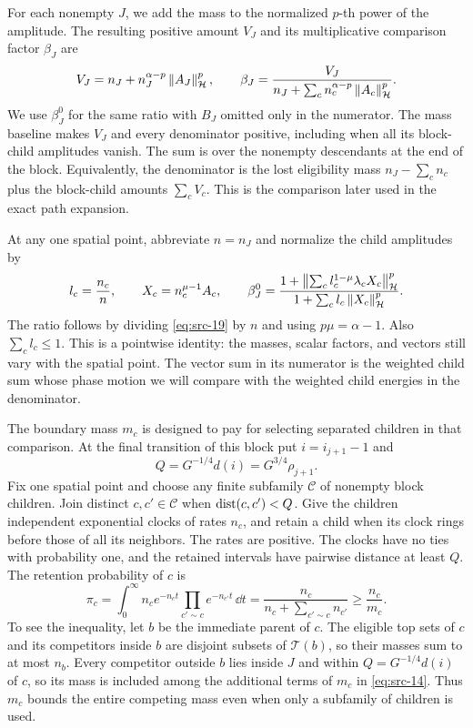 For each nonempty $J$, we add the mass to the normalized $p$-th power
of the amplitude.  The resulting positive amount $V_J$ and its
multiplicative comparison factor $\beta_J$ are
\begin{equation}
 V_J=n_J+n_J^{\alpha-p}\left\|A_J\right\|_{\mathcal H}^p,
 \qquad
 \beta_J=
 \frac{V_J}{n_J+\sum_c n_c^{\alpha-p}\left\|A_c\right\|_{\mathcal H}^p}.
 \label{eq:src-19}
\end{equation}
We use $\beta_J^0$ for the same ratio with $B_J$ omitted only in the
numerator.  The mass baseline makes $V_J$ and every denominator positive,
including when all its block-child amplitudes vanish.  The sum is over
the nonempty descendants at the end of the block.  Equivalently, the
denominator is the lost eligibility mass $n_J-\sum_c n_c$ plus the
block-child amounts $\sum_c V_c$.  This is the comparison later used
in the exact path expansion.

At any one spatial point, abbreviate $n=n_J$ and normalize the child
amplitudes by
\begin{equation}
 l_c=\frac{n_c}{n},\qquad
 X_c=n_c^{\mu-1}A_c,\qquad
 \beta_J^0=
  \frac{1+\left\|\sum_c l_c^{1-\mu}\lambda_c X_c\right\|_{\mathcal H}^p}
       {1+\sum_c l_c\left\|X_c\right\|_{\mathcal H}^p}.
 \label{eq:src-25}
\end{equation}
The ratio follows by dividing \eqref{eq:src-19} by $n$ and using
$p\mu=\alpha-1$.  Also $\sum_c l_c\le1$.  This is a pointwise identity:
the masses, scalar factors, and vectors still vary with the spatial
point.  The vector sum in its numerator is the weighted child sum whose
phase motion we will compare with the weighted child energies in the
denominator.

The boundary mass $m_c$ is designed to pay for selecting separated
children in that comparison.  At the final transition of this block put
$i=i_{j+1}-1$ and
\begin{equation}
 Q=G^{-1/4}d(i)=G^{3/4}\rho_{j+1}.
 \label{hier:child-separation}
\end{equation}
Fix one spatial point and choose any finite subfamily $\mathcal C$ of
nonempty block children.  Join distinct $c,c'\in\mathcal C$ when
$\operatorname{dist}(c,c')<Q$.  Give the children independent exponential clocks of
rates $n_c$, and retain a child when its clock rings before those of all
its neighbors.  The rates are positive.  The clocks have no ties with
probability one, and the retained intervals have pairwise distance at
least $Q$.  The retention probability of $c$ is
\begin{equation}
 \pi_c=\int_0^\infty n_c e^{-n_ct}
              \prod_{c'\sim c}e^{-n_{c'}t}\,\dd t
       =\frac{n_c}{n_c+\sum_{c'\sim c}n_{c'}}
       \ge\frac{n_c}{m_c}.
 \label{pred:retention-probability}
\end{equation}
To see the inequality, let $b$ be the immediate parent of $c$.  The
eligible top sets of $c$ and its competitors inside $b$ are disjoint
subsets of $\mathcal T(b)$, so their masses sum to at most $n_b$.
Every competitor outside $b$ lies inside $J$ and within
$Q=G^{-1/4}d(i)$ of $c$, so its mass is included among the additional
terms of $m_c$ in \eqref{eq:src-14}.  Thus $m_c$ bounds the entire
competing mass even when only a subfamily of children is used.

